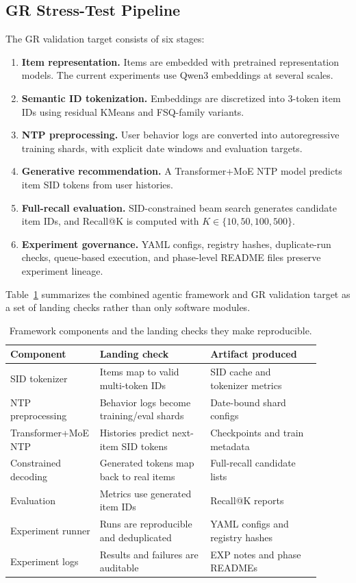 \documentclass[11pt]{article}
\begin{document}
\subsection{GR Stress-Test Pipeline}

The GR validation target consists of six stages:

\begin{enumerate}
  \item \textbf{Item representation.} Items are embedded with pretrained representation models. The current experiments use Qwen3 embeddings at several scales.
  \item \textbf{Semantic ID tokenization.} Embeddings are discretized into 3-token item IDs using residual KMeans and FSQ-family variants.
  \item \textbf{NTP preprocessing.} User behavior logs are converted into autoregressive training shards, with explicit date windows and evaluation targets.
  \item \textbf{Generative recommendation.} A Transformer+MoE NTP model predicts item SID tokens from user histories.
  \item \textbf{Full-recall evaluation.} SID-constrained beam search generates candidate item IDs, and Recall@K is computed with $K\in\{10,50,100,500\}$.
  \item \textbf{Experiment governance.} YAML configs, registry hashes, duplicate-run checks, queue-based execution, and phase-level README files preserve experiment lineage.
\end{enumerate}

Table~\ref{tab:framework-artifact} summarizes the combined agentic framework and GR validation target as a set of landing checks rather than only software modules.

\begin{table}[t]
\centering
\caption{Framework components and the landing checks they make reproducible.}
\label{tab:framework-artifact}
\begin{tabular}{p{0.20\linewidth}p{0.35\linewidth}p{0.35\linewidth}}
\toprule
Component & Landing check & Artifact produced \\
\midrule
SID tokenizer & Items map to valid multi-token IDs & SID cache and tokenizer metrics \\
NTP preprocessing & Behavior logs become training/eval shards & Date-bound shard configs \\
Transformer+MoE NTP & Histories predict next-item SID tokens & Checkpoints and train metadata \\
Constrained decoding & Generated tokens map back to real items & Full-recall candidate lists \\
Evaluation & Metrics use generated item IDs & Recall@K reports \\
Experiment runner & Runs are reproducible and deduplicated & YAML configs and registry hashes \\
Experiment logs & Results and failures are auditable & EXP notes and phase READMEs \\
\bottomrule
\end{tabular}
\end{table}
\end{document}
